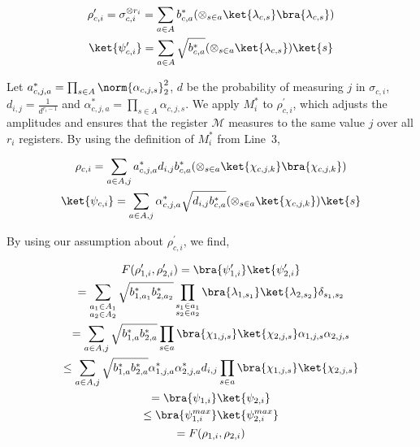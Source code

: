 \documentclass[10pt,a4paper]{article}
\begin{document}
\[\begin{gathered}
\displaystyle\rho^{\prime}_{c,i} \displaystyle=\sigma_{c,i}^{\otimes r_{i}}=\sum_{a\in A}b^{*}_{c,a}(\otimes_{s\in a}\ket{\lambda_{c,s}}\bra{\lambda_{c,s}}) \\
\displaystyle\ket{\psi^{\prime}_{c,i}} \displaystyle=\sum_{a\in A}\sqrt{b^{*}_{c,a}}(\otimes_{s\in a}\ket{\lambda_{c,s}})\ket{s}
\end{gathered}\]


Let $a^{*}_{c,j,a}=\prod_{s\in A}\norm{\alpha_{c,j,s}}_{2}^{2}$, $d$ be the probability of measuring $j$ in $\sigma_{c,i}$, $d_{i,j}=\frac{1}{d^{r_{i}-1}}$ and $\alpha^{*}_{c,j,a}=\prod_{s\in A}\alpha_{c,j,s}$.
We apply $M^{*}_{i}$ to $\rho^{\prime}_{c,i}$, which adjusts the amplitudes and ensures that the register $\mathcal{M}$ measures to the same value $j$ over all $r_{i}$ registers. By using the definition of $M^{*}_{i}$ from Line 3,\par


\[\begin{gathered}
\displaystyle\rho_{c,i} \displaystyle=\sum_{a\in A,j}a^{*}_{c,j,a}d_{i,j}b^{*}_{c,a}(\otimes_{s\in a}\ket{\chi_{c,j,k}}\bra{\chi_{c,j,k}}) \\
\displaystyle\ket{\psi_{c,i}} \displaystyle=\sum_{a\in A,j}\alpha^{*}_{c,j,a}\sqrt{d_{i,j}b^{*}_{c,a}}(\otimes_{s\in a}\ket{\chi_{c,j,k}})\ket{s}
\end{gathered}\]


By using our assumption about $\rho^{\prime}_{c,i}$, we find,\par


\[\begin{gathered}
\displaystyle F(\rho^{\prime}_{1,i},\rho^{\prime}_{2,i}) \displaystyle=\bra{\psi^{\prime}_{1,i}}\ket{\psi^{\prime}_{2,i}} \\
\displaystyle=\sum_{\begin{subarray}{c}a_{1}\in A_{1}\\
a_{2}\in A_{2}\end{subarray}}\sqrt{b^{*}_{1,a_{1}}b^{*}_{2,a_{2}}}\prod_{\begin{subarray}{c}s_{1}\in a_{1}\\
s_{2}\in a_{2}\end{subarray}}\bra{\lambda_{1,s_{1}}}\ket{\lambda_{2,s_{2}}}\delta_{s_{1},s_{2}} \\
\displaystyle=\sum_{a\in A,j}\sqrt{b^{*}_{1,a}b^{*}_{2,a}}\prod_{s\in a}\bra{\chi_{1,j,s}}\ket{\chi_{2,j,s}}\alpha_{1,j,s}\alpha_{2,j,s} \\
\displaystyle\leq\sum_{a\in A,j}\sqrt{b^{*}_{1,a}b^{*}_{2,a}}\alpha^{*}_{1,j,a}\alpha^{*}_{2,j,a}d_{i,j}\prod_{s\in a}\bra{\chi_{1,j,s}}\ket{\chi_{2,j,s}} \\
\displaystyle=\bra{\psi_{1,i}}\ket{\psi_{2,i}} \\
\displaystyle\leq\bra{\psi^{max}_{1,i}}\ket{\psi^{max}_{2,i}} \\
\displaystyle=F(\rho_{1,i},\rho_{2,i})
\end{gathered}\]
\end{document}
